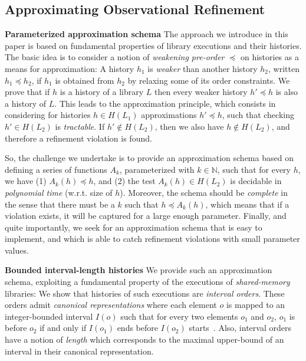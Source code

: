 \subsection{Approximating Observational Refinement}
\label{sec:intro:approx}

\noindent
{\bf Parameterized approximation schema}
The approach we introduce in this paper is based on fundamental properties of
library executions and their histories. The basic idea is to consider a notion
of \emph{weakening pre-order} $\preceq$ on histories as a means for
approximation: A history $h_1$ is \emph{weaker} than another history $h_2$,
written $h_1 \preceq h_2$, if $h_1$ is obtained from $h_2$ by relaxing some of
its order constraints. We prove that if $h$ is a history of a library $L$ then 
every weaker history $h'\preceq h$ is also a history of $L$. This leads to the approximation principle, 
which consists in considering for histories $h\in H(L_1)$ approximations $h' \preceq h$, such that checking 
$h' \in H(L_2)$ is \emph{tractable}. If $h' \not\in H(L_2)$, then we also have $h \not\in
H(L_2)$, and therefore a refinement violation is found.

So, the challenge we undertake is to provide an approximation schema based on
defining a series of functions $A_k$, parameterized with $k \in \mathbb{N}$,
such that for every $h$, we have (1) $A_k (h) \preceq h$, and (2) the test
$A_k(h) \in H(L_2)$ is decidable in \emph{polynomial time} (w.r.t. size of $h$).
Moreover, the schema should be \emph{complete} in the sense that there must be a
$k$ such that $h \preceq A_k(h)$, which means that if a violation exists, it
will be captured for a large enough parameter. Finally, and quite importantly,
we seek for an approximation schema that is easy to implement, and which is
able to catch refinement violations with small parameter values.

\vspace{1mm}
\noindent
{\bf Bounded interval-length histories}
We provide such an approximation schema, exploiting a fundamental
property of the executions of \emph{shared-memory} libraries: We show
that histories of such executions are \emph{interval orders}. These orders
admit \emph{canonical representations} where each element $o$ is
mapped to an integer-bounded interval $I(o)$ such that for every two elements
$o_1$ and $o_2$, $o_1$ is before $o_2$ if and only if $I(o_1)$ ends before
$I(o_2)$ starts~\cite{phd/Greenough76}. Also, interval orders have a 
notion of \emph{length} which corresponds to the maximal upper-bound of an
interval in their canonical representation.

